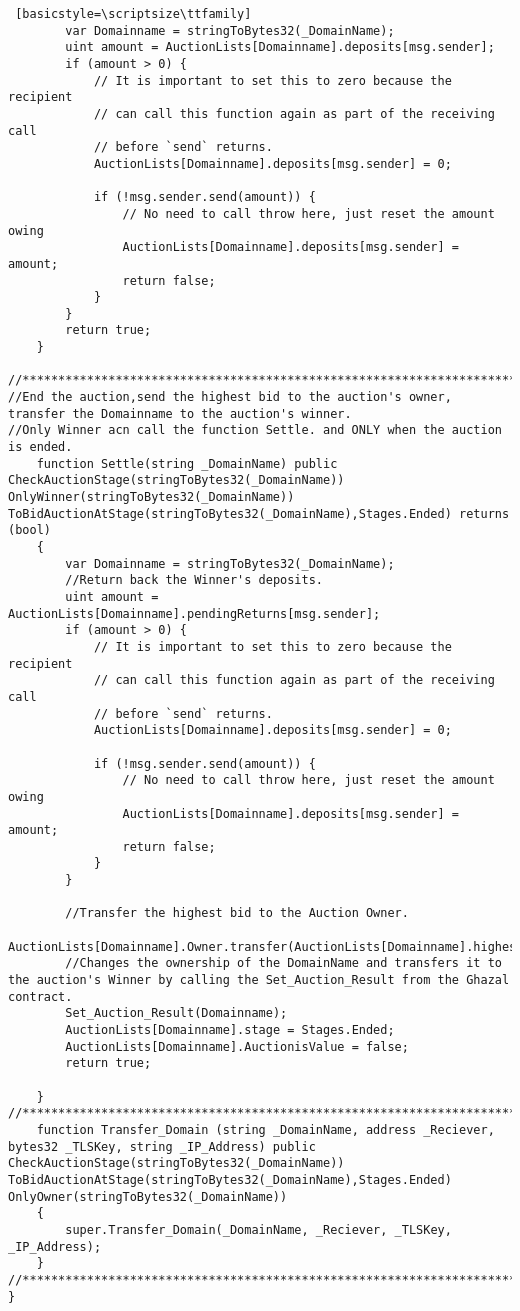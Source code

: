 \begin{lstlisting} [basicstyle=\scriptsize\ttfamily]
        var Domainname = stringToBytes32(_DomainName);
        uint amount = AuctionLists[Domainname].deposits[msg.sender];
        if (amount > 0) {
            // It is important to set this to zero because the recipient
            // can call this function again as part of the receiving call
            // before `send` returns.
            AuctionLists[Domainname].deposits[msg.sender] = 0;

            if (!msg.sender.send(amount)) {
                // No need to call throw here, just reset the amount owing
                AuctionLists[Domainname].deposits[msg.sender] = amount;
                return false;
            }
        }
        return true;
    }

//********************************************************************************************************************
//End the auction,send the highest bid to the auction's owner, transfer the Domainname to the auction's winner.
//Only Winner acn call the function Settle. and ONLY when the auction is ended.
    function Settle(string _DomainName) public CheckAuctionStage(stringToBytes32(_DomainName))  OnlyWinner(stringToBytes32(_DomainName)) ToBidAuctionAtStage(stringToBytes32(_DomainName),Stages.Ended) returns (bool)
    {
        var Domainname = stringToBytes32(_DomainName);
        //Return back the Winner's deposits.
        uint amount = AuctionLists[Domainname].pendingReturns[msg.sender];
        if (amount > 0) {
            // It is important to set this to zero because the recipient
            // can call this function again as part of the receiving call
            // before `send` returns.
            AuctionLists[Domainname].deposits[msg.sender] = 0;

            if (!msg.sender.send(amount)) {
                // No need to call throw here, just reset the amount owing
                AuctionLists[Domainname].deposits[msg.sender] = amount;
                return false;
            }
        }

        //Transfer the highest bid to the Auction Owner.
        AuctionLists[Domainname].Owner.transfer(AuctionLists[Domainname].highestBid);
        //Changes the ownership of the DomainName and transfers it to the auction's Winner by calling the Set_Auction_Result from the Ghazal contract.
        Set_Auction_Result(Domainname);
        AuctionLists[Domainname].stage = Stages.Ended;
        AuctionLists[Domainname].AuctionisValue = false;
        return true;

    }
//********************************************************************************************************************
    function Transfer_Domain (string _DomainName, address _Reciever, bytes32 _TLSKey, string _IP_Address) public CheckAuctionStage(stringToBytes32(_DomainName)) ToBidAuctionAtStage(stringToBytes32(_DomainName),Stages.Ended) OnlyOwner(stringToBytes32(_DomainName))
    {
        super.Transfer_Domain(_DomainName, _Reciever, _TLSKey, _IP_Address);
    }
//********************************************************************************************************************
}

\end{lstlisting}